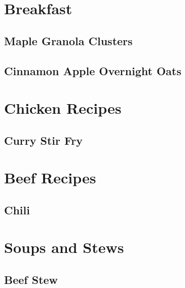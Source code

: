 \documentclass{report}
\begin{document}
\tableofcontents


\chapter{Breakfast}

%

\section{Maple Granola Clusters}


\newpage
\section{Cinnamon Apple Overnight Oats}


\chapter{Chicken Recipes}
\newpage
\section{Curry Stir Fry}

 
\chapter{Beef Recipes}
\newpage
\section{Chili}

\newpage



\chapter{Soups and Stews}
\newpage 

\section{Beef Stew}

\newpage 
\end{document}
